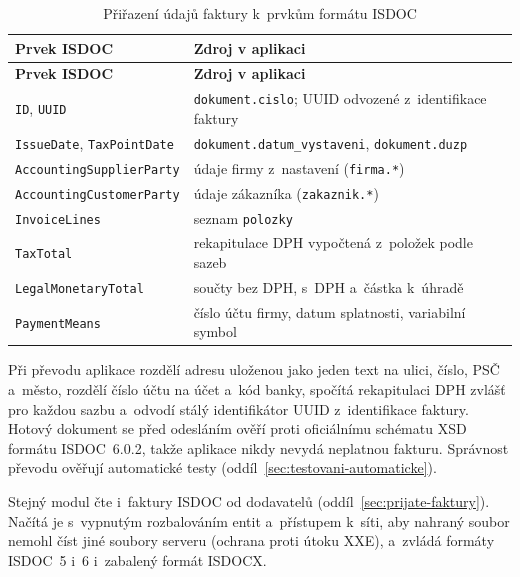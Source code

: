 \begin{longtable}{p{}p{}}
\caption{Přiřazení údajů faktury k~prvkům formátu ISDOC}\label{tab:isdoc}\\
\hline \textbf{Prvek ISDOC} & \textbf{Zdroj v aplikaci} \\ \hline\endfirsthead
\hline \textbf{Prvek ISDOC} & \textbf{Zdroj v aplikaci} \\ \hline\endhead
\texttt{ID}, \texttt{UUID} & \texttt{dokument.cislo}; UUID odvozené z~identifikace faktury \\
\texttt{IssueDate}, \texttt{TaxPointDate} & \texttt{dokument.datum\_vystaveni}, \texttt{dokument.duzp} \\
\texttt{AccountingSupplierParty} & údaje firmy z~nastavení (\texttt{firma.*}) \\
\texttt{AccountingCustomerParty} & údaje zákazníka (\texttt{zakaznik.*}) \\
\texttt{InvoiceLines} & seznam \texttt{polozky} \\
\texttt{TaxTotal} & rekapitulace DPH vypočtená z~položek podle sazeb \\
\texttt{LegalMonetaryTotal} & součty bez DPH, s~DPH a~částka k~úhradě \\
\texttt{PaymentMeans} & číslo účtu firmy, datum splatnosti, variabilní symbol \\
\hline
\end{longtable}

Při převodu aplikace rozdělí adresu uloženou jako jeden text na ulici, číslo, PSČ a~město, rozdělí číslo účtu na účet a~kód banky, spočítá rekapitulaci DPH zvlášť pro každou sazbu a~odvodí stálý identifikátor UUID z~identifikace faktury. Hotový dokument se před odesláním ověří proti oficiálnímu schématu XSD formátu ISDOC~6.0.2, takže aplikace nikdy nevydá neplatnou fakturu. Správnost převodu ověřují automatické testy (oddíl~\ref{sec:testovani-automaticke}).

Stejný modul čte i~faktury ISDOC od dodavatelů (oddíl~\ref{sec:prijate-faktury}). Načítá je s~vypnutým rozbalováním entit a~přístupem k~síti, aby nahraný soubor nemohl číst jiné soubory serveru (ochrana proti útoku XXE), a~zvládá formáty ISDOC~5 i~6 i~zabalený formát ISDOCX.\label{sec:isdoc-import}

